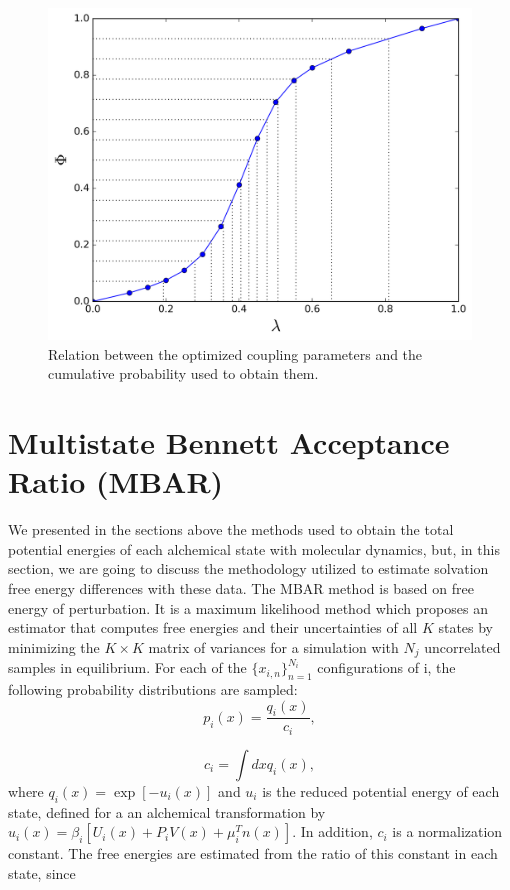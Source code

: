     \begin{figure}[h]
    	\centering
    	\includegraphics[width=0.8\linewidth]{Figures/optimized_cdfexeample}
    	\caption{Relation between the optimized coupling parameters and the cumulative probability used to obtain them.}
    	\label{fig:optimized_cdfexeample}
    \end{figure}

\section{Multistate Bennett Acceptance Ratio (MBAR)}\label{mbar}

We presented in the sections above the methods used to obtain the total potential energies of each alchemical state with molecular dynamics, but, in this section, we are going to discuss the methodology utilized to estimate solvation free energy differences with these data. The MBAR method \cite{mbar} is based on free energy of perturbation. It is a maximum likelihood method which proposes an estimator that computes free energies and their uncertainties of all $K$ states by minimizing the $K \times K$ matrix of variances for a simulation with $N_{j}$ uncorrelated samples in equilibrium. For each of the $\lbrace x_{i,n } \rbrace ^{N_{i}}_{n=1 }$ configurations of i, the following probability distributions are sampled:
\begin{equation}
p_{i}(x) = \frac{q_{i}(x)}{c_{i}},
\end{equation}

\begin{equation}
c_{i} = \int dx q_{i}(x),
\end{equation}
where $q_{i}(x)=\exp[-u_{i}(x)]$ and $u_{i}$ is the reduced potential energy of each state, defined for a an alchemical transformation by $u_{i} (x)= \beta_{i} [U_{i}(x)+P_{i}V(x) + \mu _{i}^{T}n(x)]$. In addition, $c_{i}$ is a normalization constant.  The free energies are estimated from the ratio of this constant in each state, since

